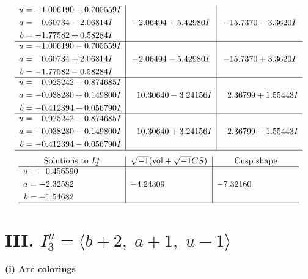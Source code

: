 \documentclass[1p]{elsarticle_modified}
\theoremstyle{definition}
\newcommand{\I}{\sqrt{-1}}
\begin{document}
$$\begin{array}{c|c|c}
\begin{aligned}
u &= -1.006190 + 0.705559 I \\
a &= \phantom{-}0.60734 - 2.06814 I \\
b &= -1.77582 + 0.58284 I\end{aligned}
 & -2.06494 + 5.42980 I & -15.7370 - 3.3620 I \\ \hline\begin{aligned}
u &= -1.006190 - 0.705559 I \\
a &= \phantom{-}0.60734 + 2.06814 I \\
b &= -1.77582 - 0.58284 I\end{aligned}
 & -2.06494 - 5.42980 I & -15.7370 + 3.3620 I \\ \hline\begin{aligned}
u &= \phantom{-}0.925242 + 0.874685 I \\
a &= -0.038280 + 0.149800 I \\
b &= -0.412394 + 0.056790 I\end{aligned}
 & \phantom{-}10.30640 - 3.24156 I & \phantom{-}2.36799 + 1.55443 I \\ \hline\begin{aligned}
u &= \phantom{-}0.925242 - 0.874685 I \\
a &= -0.038280 - 0.149800 I \\
b &= -0.412394 - 0.056790 I\end{aligned}
 & \phantom{-}10.30640 + 3.24156 I & \phantom{-}2.36799 - 1.55443 I\\
 \hline 
 \end{array}$$\newpage$$\begin{array}{c|c|c}  
\text{Solutions to }I^u_{2}& \I (\text{vol} + \sqrt{-1}CS) & \text{Cusp shape}\\
 \hline 
\begin{aligned}
u &= \phantom{-}0.456590\phantom{ +0.000000I} \\
a &= -2.32582\phantom{ +0.000000I} \\
b &= -1.54682\phantom{ +0.000000I}\end{aligned}
 & -4.24309\phantom{ +0.000000I} & -7.32160\phantom{ +0.000000I}\\
 \hline 
 \end{array}$$\newpage\newpage\renewcommand{\arraystretch}{1}
\centering \section*{III. $I^u_{3}= \langle b+2,\;a+1,\;u-1 \rangle$}
\flushleft \textbf{(i) Arc colorings}\\
\end{document}
